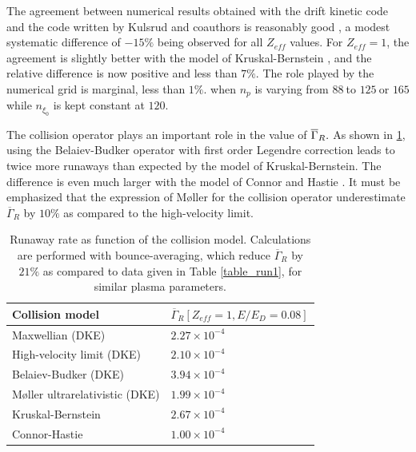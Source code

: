 The agreement between numerical results obtained with the drift kinetic code
and the code written by Kulsrud and coauthors is reasonably good \cite{kul73}%
, a modest systematic difference of $-15\%$ being observed for all $Z_{eff}$
values. For $Z_{eff}=1$, the agreement is slightly better with the model of
Kruskal-Bernstein \cite{kru62}, and the relative difference is now positive
and less than $7\%$. The role played by the numerical grid is marginal, less
than $1\%$. when $n_{p}$ is varying from $88\ $to $125\ $or $165$ while $%
n_{\xi _{0}}$ is kept constant at $120.$

The collision operator plays an important role in the value of $\overline{%
\Gamma }_{R}.$ As shown in \ref{table_run1b}, using the Belaiev-Budker
operator with first order Legendre correction leads to twice more runaways
than expected by the model of Kruskal-Bernstein. The difference is even much
larger with the model of Connor and Hastie \cite{con75}. It must be
emphasized that the expression of M\o ller for the collision operator
underestimate $\overline{\Gamma }_{R}$ by $10\%$ as compared to the
high-velocity limit.
\begin{table}[tbp]
\begin{center}
\begin{tabular}{|l|l|}
\hline
Collision model & $\overline{\Gamma }_{R}[Z_{eff}=1,E/E_{D}=0.08]$ \\ \hline
Maxwellian (DKE) & $2.27\times 10^{-4}$ \\ \hline
High-velocity limit (DKE) & $2.10\times 10^{-4}$ \\ \hline
Belaiev-Budker (DKE) & $3.94\times 10^{-4}$ \\ \hline
M\o ller ultrarelativistic (DKE) & $1.99\times 10^{-4}$ \\ \hline
Kruskal-Bernstein & $2.67\times 10^{-4}$ \\ \hline
Connor-Hastie & $1.00\times 10^{-4}$ \\ \hline
\end{tabular}
\end{center}
\caption{Runaway rate as function of the collision model. Calculations are
performed with bounce-averaging, which reduce $\overline{\Gamma }_{R}$ by $%
21\%$ as compared to data given in Table \ref{table_run1}, for similar
plasma parameters.}
\label{table_run1b}
\end{table}

